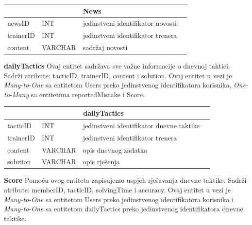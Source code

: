 \documentclass{article}
\begin{document}
\begin{center}
    \begin{tabular}{ | l | l | l | p{5cm} |}
    \hline
    \multicolumn{3}{|c|}{News}  \\ \hline
   \cellcolor{green!25}newsID & INT & jedinstveni identifikator novosti \\ \hline
    \cellcolor{blue!15}trainerID & INT & jedinstveni identifikator trenera \\ \hline
    content & VARCHAR & sadržaj novosti \\ \hline 
    \end{tabular}
\end{center}





\textbf{dailyTactics} Ovaj entitet sadržava sve važne informacije o dnevnoj taktici. Sadrži atribute: tacticID, trainerID, content i solution. Ovaj entitet u vezi je \textit{Many-to-One} sa entitetom Users preko jedinstvenog identifikatora korisnika, \textit{One-to-Many} sa entitetima reportedMistake i Score.
		\\



\begin{center}
    \begin{tabular}{ | l | l | l | p{5cm} |}
    \hline
    \multicolumn{3}{|c|}{dailyTactics}  \\ \hline
   \cellcolor{green!25}tacticID & INT & jedinstveni identifikator dnevne taktike \\ \hline
    \cellcolor{blue!15}trainerID & INT & jedinstveni identifikator trenera \\ \hline
   content & VARCHAR & opis dnevnog zadatka \\ \hline 
    solution & VARCHAR & opis rješenja \\ \hline 
    \end{tabular}
\end{center}
\bigskip
\bigskip



\textbf{Score} Pomoću ovog entiteta zapisujemo uspjeh rješavanja dnevne taktike. Sadrži atribute: memberID, tacticID, solvingTime i accuracy. Ovaj entitet u vezi je \textit{Many-to-One} sa entitetom Users preko jedinstvenog identifikatora korisnika i \textit{Many-to-One} sa entitetom dailyTactics preko jedinstvenog identifikatora dnevne taktike.
		\\
\end{document}
